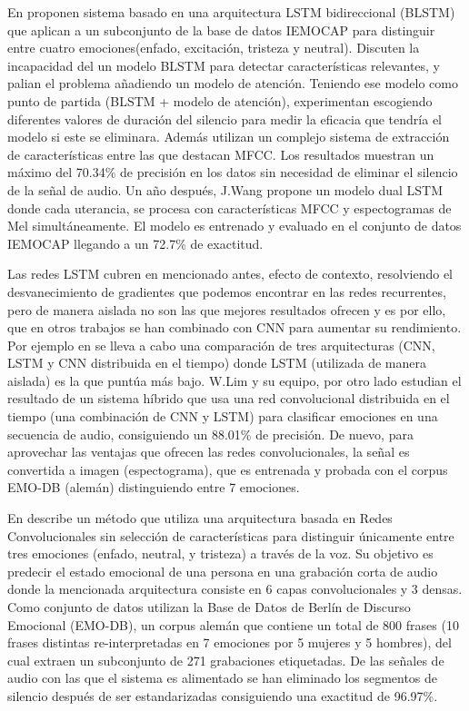 \documentclass[11pt,a4paper,spanish]{book}
\begin{document}
	En \cite{Atmaja2019} proponen sistema basado en una arquitectura LSTM bidireccional (BLSTM) que aplican a un subconjunto de la base de datos IEMOCAP para distinguir entre cuatro emociones(enfado, excitación, tristeza y neutral). Discuten la incapacidad del un modelo BLSTM para detectar características relevantes, y palian el problema añadiendo un modelo de atención. Teniendo ese modelo como punto de partida (BLSTM + modelo de atención), experimentan escogiendo diferentes valores de duración del silencio para medir la eficacia que tendría el modelo si este se eliminara. Además utilizan un complejo sistema de extracción de características entre las que destacan MFCC. Los resultados muestran un máximo del 70.34\% de precisión en los datos sin necesidad de eliminar el silencio de la señal de audio.
	Un año después, J.Wang \cite{Wang2020} propone un modelo dual LSTM donde cada uterancia, se procesa con características MFCC y espectogramas de Mel simultáneamente. El modelo es entrenado y evaluado en el conjunto de datos IEMOCAP llegando a un 72.7\% de exactitud.
		
	Las redes LSTM cubren en mencionado antes, efecto de contexto, resolviendo el desvanecimiento de gradientes que podemos encontrar en las redes recurrentes, pero de manera aislada no son las que mejores resultados ofrecen y es por ello, que en otros trabajos se han combinado con CNN para aumentar su rendimiento. Por ejemplo en \cite{Lim2017} se lleva a cabo una comparación de tres  arquitecturas (CNN, LSTM y CNN distribuida en el tiempo) donde LSTM (utilizada de manera aislada) es la que puntúa más bajo. W.Lim y su equipo, por otro lado estudian el resultado de un sistema híbrido que usa una red convolucional distribuida en el tiempo (una combinación de CNN y LSTM) para clasificar emociones en una secuencia de audio, consiguiendo un 88.01\% de precisión. De nuevo, para aprovechar las ventajas que ofrecen las redes convolucionales, la señal es convertida a imagen (espectograma), que es entrenada y probada con el corpus EMO-DB (alemán) distinguiendo entre 7 emociones.
	
	En \cite{Harar2017} describe un método que utiliza una arquitectura basada en Redes Convolucionales sin selección de características para distinguir únicamente entre tres emociones (enfado, neutral, y tristeza) a través de la voz. Su objetivo es predecir el estado emocional de una persona en una grabación corta de audio donde la mencionada arquitectura consiste en 6 capas convolucionales y 3 densas. Como conjunto de datos utilizan la Base de Datos de Berlín de Discurso Emocional (EMO-DB), un corpus alemán que contiene un total de 800 frases (10 frases distintas re-interpretadas en 7 emociones por 5 mujeres y 5 hombres), del cual extraen un subconjunto de 271 grabaciones etiquetadas. De las señales de audio con las que el sistema es alimentado se han eliminado los segmentos de silencio después de ser estandarizadas consiguiendo una exactitud de 96.97\%.
	
\end{document}
